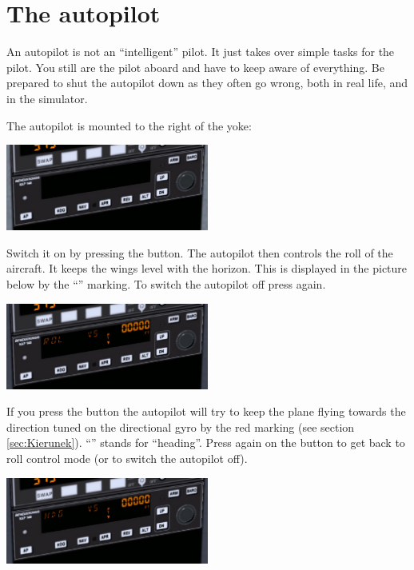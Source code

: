 \section{The autopilot}
\label{sec:Autopilot}
    
An autopilot is not an ``intelligent'' pilot. It just takes over simple tasks
for the pilot. You still are the pilot aboard and have to keep aware of 
everything. Be prepared to shut the autopilot down as they often go wrong,
both in real life, and in the simulator. 
    
The autopilot is mounted to the right of the yoke:

\begin{center}
\includegraphics[width=0.5\textwidth]{img/tut_49}
\end{center}

Switch it on by pressing the  button.
The autopilot then controls the roll of the aircraft. It keeps the wings level with the horizon. This is 
displayed in the picture below by the ``\textcolor{orange}{}''
marking. To switch the autopilot off press  again.

\begin{center}
\includegraphics[width=0.5\textwidth]{img/tut_50}
\end{center}

 If you press the  button the autopilot will try to keep
the plane flying towards the direction tuned on the directional gyro by
the red marking (see section \ref{sec:Kierunek}). 
``\textcolor{orange}{}'' stands for ``heading''. Press
again on the  button to get back to roll control mode (or
 to switch the autopilot off).

\begin{center}
\includegraphics[width=0.5\textwidth]{img/tut_51}
\end{center}

